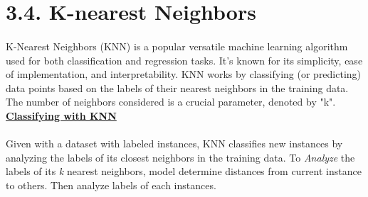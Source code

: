 \documentclass[a4paper]{report}
\begin{document}
	
	\section*{\Large 3.4. K-nearest Neighbors}
	\paragraph{} \Large
	K-Nearest Neighbors (KNN) is a popular versatile machine learning algorithm used for both classification and regression tasks. It's known for its simplicity, ease of implementation, and interpretability. KNN works by classifying (or predicting) data points based on the labels of their nearest neighbors in the training data. The number of neighbors considered is a crucial parameter, denoted by "k". \\
	
	\underline{\textbf{\Large Classifying with KNN}}
	
	\paragraph{}
	Given with a dataset with labeled instances, KNN classifies new instances by analyzing the labels of its closest neighbors in the training data. To \textit{Analyze} the labels of its \textit{k} nearest neighbors, model determine distances from current instance to others. Then analyze labels of each instances.\\
	
\end{document}

